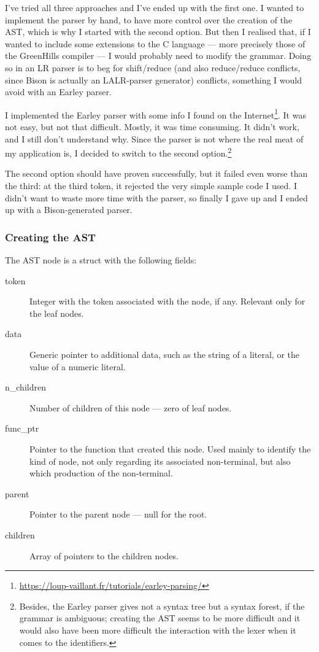 \documentclass[a4paper,openany]{article}
\begin{document}
I've tried all three approaches and I've ended up with the first one. I wanted to implement the parser by hand, to have more control over the creation of the AST, which is why I started with the second option. But then I realised that, if I wanted to include some extensions to the C language --- more precisely those of the GreenHills compiler --- I would probably need to modify the grammar. Doing so in an LR parser is to beg for shift/reduce (and also reduce/reduce conflicts, since Bison is actually an LALR-parser generator) conflicts, something I would avoid with an Earley parser.

I implemented the Earley parser with some info I found on the Internet\footnote{\url{https://loup-vaillant.fr/tutorials/earley-parsing/}}. It was not easy, but not that difficult. Mostly, it was time consuming. It didn't work, and I still don't understand why. Since the parser is not where the real meat of my application is, I decided to switch to the second option.\footnote{Besides, the Earley parser gives not a syntax tree but a syntax forest, if the grammar is ambiguous; creating the AST seems to be more difficult and it would also have been more difficult the interaction with the lexer when it comes to the identifiers.}

The second option should have proven successfully, but it failed even worse than the third: at the third token, it rejected the very simple sample code I used. I didn't want to waste more time with the parser, so finally I gave up and I ended up with a Bison-generated parser.

\subsubsection{Creating the AST}
The AST node is a struct with the following fields:

\begin{description}
\item[token] Integer with the token associated with the node, if any. Relevant only for the leaf nodes.

\item[data] Generic pointer to additional data, such as the string of a literal, or the value of a numeric literal.

\item[n\_children] Number of children of this node --- zero of leaf nodes.

\item[func\_ptr] Pointer to the function that created this node. Used mainly to identify the kind of node, not only regarding its associated non-terminal, but also which production of the non-terminal.

\item[parent] Pointer to the parent node --- null for the root.

\item[children] Array of pointers to the children nodes.
\end{description}
\end{document}

